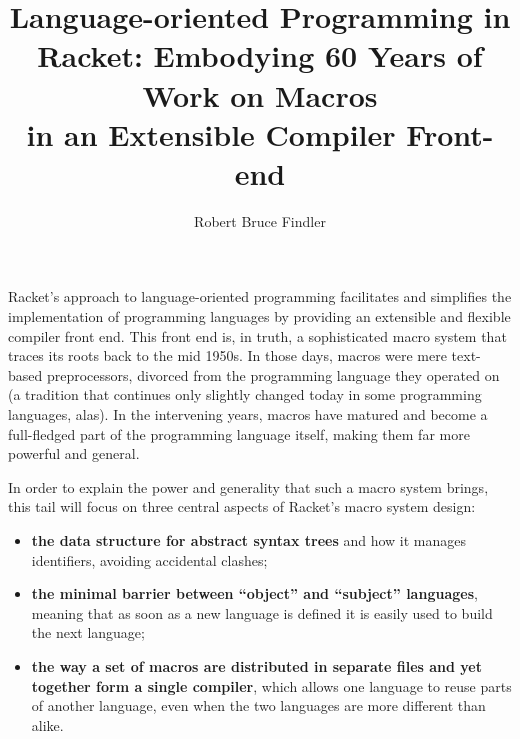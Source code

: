 \documentclass[runningheads]{llncs}
\begin{document}
\title{Language-oriented Programming in Racket: Embodying 60 Years of Work on Macros\\in an Extensible Compiler Front-end}
\author{Robert Bruce Findler}
%
\maketitle              %

\newcommand*{\mycut}{%
        0.2\textwidth, 0.4\textwidth,
        0.2\textwidth, 0.4\textwidth
}



Racket's approach to language-oriented programming facilitates and
simplifies the implementation of programming languages by providing an
extensible and flexible compiler front end. This front end is, in
truth, a sophisticated macro system that traces its roots back to the
mid 1950s. In those days, macros were mere text-based preprocessors,
divorced from the programming language they operated on (a tradition
that continues only slightly changed today in some programming
languages, alas). In the intervening years, macros have matured and
become a full-fledged part of the programming language itself, making
them far more powerful and general.

In order to explain the power and generality that such a macro system
brings, this tail will focus on three central aspects of Racket's
macro system design:
\begin{itemize}

\item \textbf{the data structure for abstract syntax trees} and how it
  manages identifiers, avoiding accidental clashes;

\item \textbf{the minimal barrier between ``object'' and ``subject''
  languages}, meaning that as soon as a new language is defined it
  is easily used to build the next language;

\item \textbf{the way a set of macros are distributed in separate
  files and yet together form a single compiler}, which allows one
  language to reuse parts of another language, even when the two
  languages are more different than alike.
\end{itemize}
\end{document}
